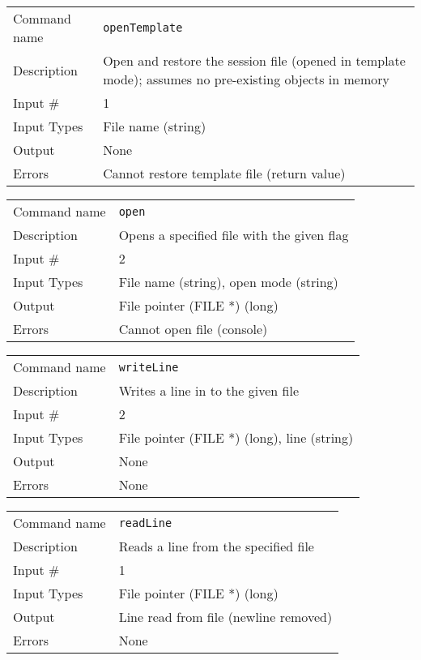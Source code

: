 \bigskip

\noindent
\begin{tabular}{l|p{5in}}
\hline
Command name & {\tt openTemplate} \\
Description  & Open and restore the session file (opened in template mode);
               assumes no pre-existing objects in memory \\
Input \#     & 1 \\
Input Types  & File name (string) \\
Output       & None \\
Errors       & Cannot restore template file (return value) \\
\hline
\end{tabular}

\bigskip

\noindent
\begin{tabular}{l|p{5in}}
\hline
Command name & {\tt open} \\
Description  & Opens a specified file with the given flag \\
Input \#     & 2 \\
Input Types  & File name (string), open mode (string) \\
Output       & File pointer (FILE *) (long) \\
Errors       & Cannot open file (console) \\
\hline
\end{tabular}

\bigskip

\noindent
\begin{tabular}{l|p{5in}}
\hline
Command name & {\tt writeLine} \\
Description  & Writes a line in to the given file \\
Input \#     & 2 \\
Input Types  & File pointer (FILE *) (long), line (string) \\
Output       & None \\
Errors       & None \\
\hline
\end{tabular}

\bigskip

\noindent
\begin{tabular}{l|p{5in}}
\hline
Command name & {\tt readLine} \\
Description  & Reads a line from the specified file \\
Input \#     & 1 \\
Input Types  & File pointer (FILE *) (long) \\
Output       & Line read from file (newline removed) \\
Errors       & None \\
\hline
\end{tabular}

